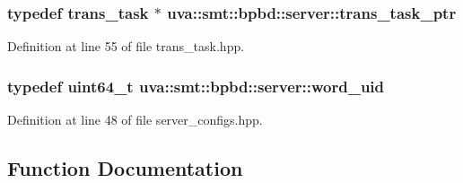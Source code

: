\hypertarget{namespaceuva_1_1smt_1_1bpbd_1_1server_a4dea4bb1185fe5d148be18ad12fea74a}{}
\subsubsection[{trans\+\_\+task\+\_\+ptr}]{\setlength{\rightskip}{0pt plus 5cm}typedef {\bf trans\+\_\+task} $\ast$ {\bf uva\+::smt\+::bpbd\+::server\+::trans\+\_\+task\+\_\+ptr}}\label{namespaceuva_1_1smt_1_1bpbd_1_1server_a4dea4bb1185fe5d148be18ad12fea74a}


Definition at line 55 of file trans\+\_\+task.\+hpp.

\hypertarget{namespaceuva_1_1smt_1_1bpbd_1_1server_a6bfe45ba344d65a7fdd7d26156328ddc}{}
\subsubsection[{word\+\_\+uid}]{\setlength{\rightskip}{0pt plus 5cm}typedef uint64\+\_\+t {\bf uva\+::smt\+::bpbd\+::server\+::word\+\_\+uid}}\label{namespaceuva_1_1smt_1_1bpbd_1_1server_a6bfe45ba344d65a7fdd7d26156328ddc}


Definition at line 48 of file server\+\_\+configs.\+hpp.



\subsection{Function Documentation}
\hypertarget{namespaceuva_1_1smt_1_1bpbd_1_1server_af54c3a6ef0c3b7ef3c01ec359b4e2d43}{}
